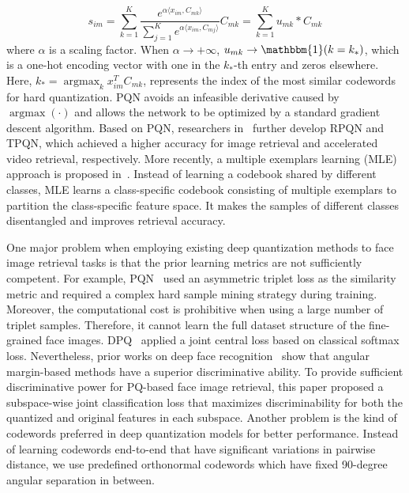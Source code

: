 \documentclass{elsarticle}
\DeclareMathOperator*{\argmax}{argmax}
\begin{document}
\begin{equation} \label{2}
s_{im} = \sum_{k=1}^{K} \frac{e^{\alpha \langle x_{im}, C_{mk}\rangle}}{\sum_{j=1}^K e^{\alpha \langle x_{im}, C_{mj} \rangle}} C_{mk} =  \sum_{k=1}^{K} u_{mk} * C_{mk}
\end{equation}
where $\alpha$ is a scaling factor. When $\alpha \rightarrow +\infty$, $u_{mk} \rightarrow \mathbbm{1}(k=k_{*})$, which is a one-hot encoding vector with one in the $k_{*}$-th entry and zeros elsewhere. Here, $k_{*}=\argmax_{k}x_{im}^TC_{mk}$, represents the index of the most similar codewords for hard quantization. PQN avoids an infeasible derivative caused by $\argmax(\cdot)$ and allows the network to be optimized by a standard gradient descent algorithm. Based on PQN, researchers in~\cite{yu2020product} further develop RPQN and TPQN, which achieved a higher accuracy for image retrieval and accelerated video retrieval, respectively. More recently, a multiple exemplars learning (MLE) approach is proposed in~\cite{yu2021multiple}. Instead of learning a codebook shared by different classes, MLE learns a class-specific codebook consisting of multiple exemplars to partition the class-specific feature space. It makes the samples of different classes disentangled and improves retrieval accuracy.

One major problem when employing existing deep quantization methods to face image retrieval tasks is that the prior learning metrics are not sufficiently competent. 
For example, PQN~\cite{yu2020product} used an asymmetric triplet loss as the similarity metric and required a complex hard sample mining strategy during training. Moreover, the computational cost is prohibitive when using a large number of triplet samples. Therefore, it cannot learn the full dataset structure of the fine-grained face images. DPQ~\cite{klein2019end} applied a joint central loss based on classical softmax loss. Nevertheless, prior works on deep face recognition~\cite{wang2018cosface,deng2019arcface} show that angular margin-based methods have a superior discriminative ability. To provide sufficient discriminative power for PQ-based face image retrieval, this paper proposed a subspace-wise joint classification loss that maximizes discriminability for both the quantized and original features in each subspace. Another problem is the kind of codewords preferred in deep quantization models for better performance. Instead of learning codewords end-to-end that have significant variations in pairwise distance, we use predefined orthonormal codewords which have fixed 90-degree angular separation in between.
\end{document}
